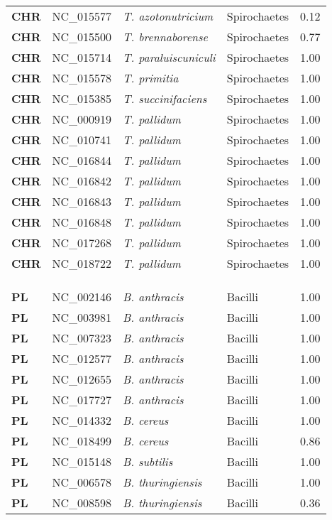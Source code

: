 \begin{adjustwidth}{-3cm}{2cm}
{\begin{supertabular}{>{\bfseries}l|p{0.1\textwidth}p{0.14\textwidth}l|l}
CHR & NC\_015577 & \textit{T. azotonutricium} & Spirochaetes & 0.12\\
CHR & NC\_015500 & \textit{T. brennaborense} & Spirochaetes & 0.77\\
CHR & NC\_015714 & \textit{T. paraluiscuniculi} & Spirochaetes & 1.00\\
CHR & NC\_015578 & \textit{T. primitia} & Spirochaetes & 1.00\\
CHR & NC\_015385 & \textit{T. succinifaciens} & Spirochaetes & 1.00\\
CHR & NC\_000919 & \textit{T. pallidum} & Spirochaetes & 1.00\\
CHR & NC\_010741 & \textit{T. pallidum} & Spirochaetes & 1.00\\
CHR & NC\_016844 & \textit{T. pallidum} & Spirochaetes & 1.00\\
CHR & NC\_016842 & \textit{T. pallidum} & Spirochaetes & 1.00\\
CHR & NC\_016843 & \textit{T. pallidum} & Spirochaetes & 1.00\\
CHR & NC\_016848 & \textit{T. pallidum} & Spirochaetes & 1.00\\
CHR & NC\_017268 & \textit{T. pallidum} & Spirochaetes & 1.00\\
CHR & NC\_018722 & \textit{T. pallidum} & Spirochaetes & 1.00\\
\\
\\
\hline\\
PL & NC\_002146 & \textit{B. anthracis} & Bacilli & 1.00\\
PL & NC\_003981 & \textit{B. anthracis} & Bacilli & 1.00\\
PL & NC\_007323 & \textit{B. anthracis} & Bacilli & 1.00\\
PL & NC\_012577 & \textit{B. anthracis} & Bacilli & 1.00\\
PL & NC\_012655 & \textit{B. anthracis} & Bacilli & 1.00\\
PL & NC\_017727 & \textit{B. anthracis} & Bacilli & 1.00\\
PL & NC\_014332 & \textit{B. cereus} & Bacilli & 1.00\\
PL & NC\_018499 & \textit{B. cereus} & Bacilli & 0.86\\
PL & NC\_015148 & \textit{B. subtilis} & Bacilli & 1.00\\
PL & NC\_006578 & \textit{B. thuringiensis} & Bacilli & 1.00\\
PL & NC\_008598 & \textit{B. thuringiensis} & Bacilli & 0.36\\

\end{supertabular}}
\end{adjustwidth}
